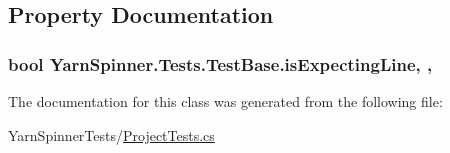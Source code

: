 \subsection{Property Documentation}
\hypertarget{a00146_a47f35b8e8123ed9471883d02b8bc9f3e}{
\subsubsection[{is\-Expecting\-Line}]{\setlength{\rightskip}{0pt plus 5cm}bool Yarn\-Spinner.\-Tests.\-Test\-Base.\-is\-Expecting\-Line\hspace{0.3cm}{\ttfamily [get]}, {\ttfamily [protected]}, {\ttfamily [inherited]}}}\label{a00146_a47f35b8e8123ed9471883d02b8bc9f3e}


The documentation for this class was generated from the following file\-:\begin{DoxyCompactItemize}
\item 
Yarn\-Spinner\-Tests/\hyperlink{a00281}{Project\-Tests.\-cs}\end{DoxyCompactItemize}
